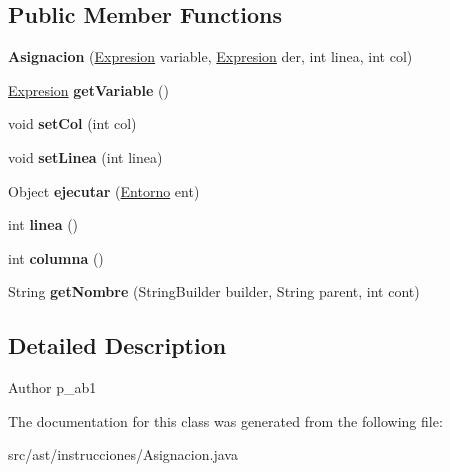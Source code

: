 \subsection*{Public Member Functions}
\begin{DoxyCompactItemize}
\item 
\mbox{\label{classast_1_1instrucciones_1_1_asignacion_ab6c0842d85fae9764e1e057fcf9aa23d}} 
{\bfseries Asignacion} (\mbox{\hyperlink{interfaceast_1_1_expresion}{Expresion}} variable, \mbox{\hyperlink{interfaceast_1_1_expresion}{Expresion}} der, int linea, int col)
\item 
\mbox{\label{classast_1_1instrucciones_1_1_asignacion_ae21cad9237c038de9adaf5dece31812f}} 
\mbox{\hyperlink{interfaceast_1_1_expresion}{Expresion}} {\bfseries get\+Variable} ()
\item 
\mbox{\label{classast_1_1instrucciones_1_1_asignacion_a51c388c932f0a15e3d85de33a2b3815b}} 
void {\bfseries set\+Col} (int col)
\item 
\mbox{\label{classast_1_1instrucciones_1_1_asignacion_afcc5b48c5e0896e772f0a2c932238dd9}} 
void {\bfseries set\+Linea} (int linea)
\item 
\mbox{\label{classast_1_1instrucciones_1_1_asignacion_a4928c014ea18272088932d40fbf62d02}} 
Object {\bfseries ejecutar} (\mbox{\hyperlink{classentorno_1_1_entorno}{Entorno}} ent)
\item 
\mbox{\label{classast_1_1instrucciones_1_1_asignacion_a854577e53808c11c41265c24afc095f6}} 
int {\bfseries linea} ()
\item 
\mbox{\label{classast_1_1instrucciones_1_1_asignacion_a2a43b9581bc35c2158decb47d2f0bc74}} 
int {\bfseries columna} ()
\item 
\mbox{\label{classast_1_1instrucciones_1_1_asignacion_a60529ed6f9300c1016f46bad95a872df}} 
String {\bfseries get\+Nombre} (String\+Builder builder, String parent, int cont)
\end{DoxyCompactItemize}


\subsection{Detailed Description}
\begin{DoxyAuthor}{Author}
p\+\_\+ab1 
\end{DoxyAuthor}


The documentation for this class was generated from the following file\+:\begin{DoxyCompactItemize}
\item 
src/ast/instrucciones/Asignacion.\+java\end{DoxyCompactItemize}
